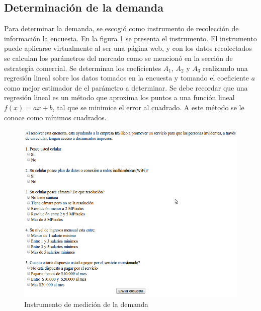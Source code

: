 \documentclass[a4paper, 12pt, oneside]{article}
\begin{document}
	\subsection{Determinación de la demanda}
	Para determinar la demanda, se escogió como instrumento de recolección de información la encuesta. En la figura \ref{fig:encuesta} se presenta el instrumento. El instrumento puede aplicarse virtualmente al ser una página web, y con los datos recolectados se calculan los parámetros del mercado como se mencionó en la sección de estrategia comercial. Se determinan los coeficientes $A_1$, $A_2$ y $A_3$ realizando una regresión lineal sobre los datos tomados en la encuesta y tomando el coeficiente $a$ como mejor estimador de el parámetro a determinar. Se debe recordar que una regresión lineal es un método que aproxima los puntos a una función lineal $f(x) = ax + b$, tal que se minimice el error al cuadrado. A este método se le conoce como mínimos cuadrados.
	
	\begin{figure}[htb]
	\begin{center}
	\leavevmode
	\includegraphics[width=12cm]{img/encuesta.png}
	\end{center}
	\caption{Instrumento de medición de la demanda}
	\label{fig:encuesta}
	\end{figure}
	
\end{document}
